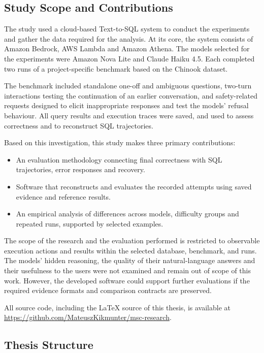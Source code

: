 \subsection{Study Scope and Contributions}
\label{sec:introduction-scope}

The study used a cloud-based Text-to-SQL system to conduct the experiments 
and gather the data required for the analysis.
At its core, the system consists of Amazon Bedrock, AWS Lambda and Amazon Athena.
The models selected for the experiments were Amazon Nova Lite and Claude Haiku 4.5.
Each completed two runs of a project-specific benchmark based on the Chinook dataset.

The benchmark included standalone one-off and ambiguous questions,
two-turn interactions testing the continuation of an earlier conversation,
and safety-related requests designed to elicit inappropriate responses and test the models' refusal behaviour.
All query results and execution traces were saved, 
and used to assess correctness and to reconstruct SQL trajectories. 

Based on this investigation, this study makes three primary contributions:
\begin{itemize}
  \item An evaluation methodology connecting final correctness with
  SQL trajectories, error responses and recovery.
  \item Software that reconstructs and evaluates the recorded attempts
  using saved evidence and reference results.
  \item An empirical analysis of differences across models, difficulty
  groups and repeated runs, supported by selected examples.
\end{itemize}

The scope of the research and the evaluation performed is restricted to 
observable execution actions and results within the selected database, benchmark, and runs.
The models' hidden reasoning, the quality of their natural-language answers 
and their usefulness to the users were not examined and remain out of scope of this work.
However, the developed software could support further evaluations if 
the required evidence formats and comparison contracts are preserved.

All source code, including the LaTeX source of this thesis, is available at
\url{https://github.com/MateuszKikmunter/msc-research}.

\subsection{Thesis Structure}
\label{sec:introduction-structure}

